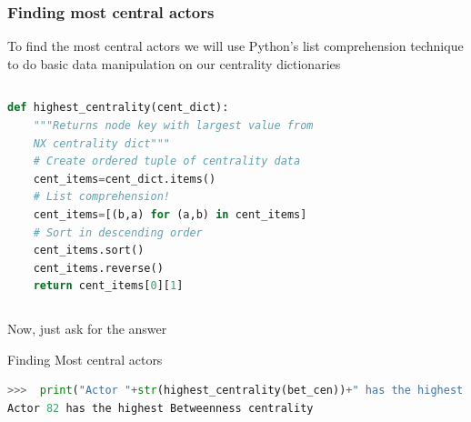 \documentclass[xcolor=dvipsnames, 9pt]{beamer}
\begin{document}
\begin{frame}[fragile]
    \frametitle{Finding most central actors}
    To find the most central actors we will use Python's list comprehension technique to do basic data manipulation on our centrality dictionaries
    \begin{columns}
            \begin{block}{}
        \tiny{\begin{lstlisting}[language=Python]
def highest_centrality(cent_dict):
    """Returns node key with largest value from
    NX centrality dict"""
    # Create ordered tuple of centrality data
    cent_items=cent_dict.items()
    # List comprehension!
    cent_items=[(b,a) for (a,b) in cent_items]
    # Sort in descending order
    cent_items.sort()
    cent_items.reverse()
    return cent_items[0][1]
        \end{lstlisting}}
            \end{block}
    \end{columns}
    \vspace{2mm}Now, just ask for the answer
    \begin{block}{Finding Most central actors}
        \tiny{\begin{lstlisting}[language=Python]
>>>  print("Actor "+str(highest_centrality(bet_cen))+" has the highest Betweenness centrality")
Actor 82 has the highest Betweenness centrality
        \end{lstlisting}}
    \end{block}
\end{frame}
\end{document}
